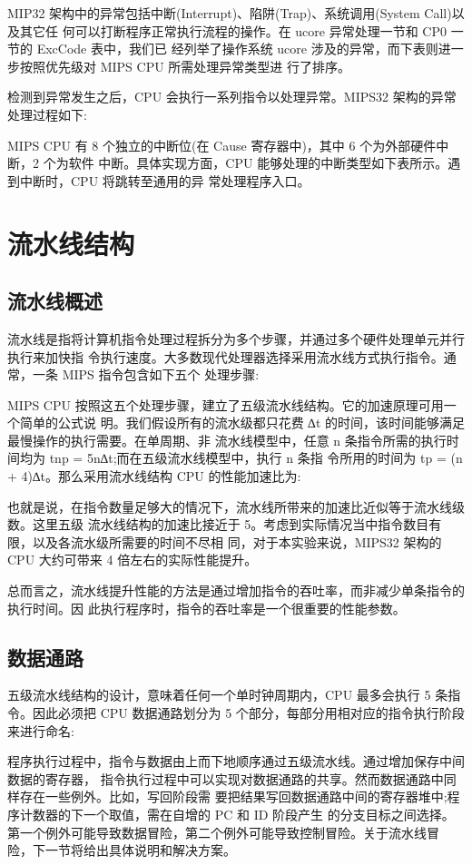 \documentclass[11pt,utf8]{article}
\begin{document}
MIP32 架构中的异常包括中断(Interrupt)、陷阱(Trap)、系统调用(System Call)以及其它任 何可以打断程序正常执行流程的操作。在 ucore 异常处理一节和 CP0 一节的 ExcCode 表中，我们已 经列举了操作系统 ucore 涉及的异常，而下表则进一步按照优先级对 MIPS CPU 所需处理异常类型进 行了排序。

检测到异常发生之后，CPU 会执行一系列指令以处理异常。MIPS32 架构的异常处理过程如下:

MIPS CPU 有 8 个独立的中断位(在 Cause 寄存器中)，其中 6 个为外部硬件中断，2 个为软件
中断。具体实现方面，CPU 能够处理的中断类型如下表所示。遇到中断时，CPU 将跳转至通用的异 常处理程序入口。

\section{流水线结构}

\subsection{流水线概述}
流水线是指将计算机指令处理过程拆分为多个步骤，并通过多个硬件处理单元并行执行来加快指 令执行速度。大多数现代处理器选择采用流水线方式执行指令。通常，一条 MIPS 指令包含如下五个 处理步骤:

MIPS CPU 按照这五个处理步骤，建立了五级流水线结构。它的加速原理可用一个简单的公式说 明。我们假设所有的流水级都只花费 ∆t 的时间，该时间能够满足最慢操作的执行需要。在单周期、非 流水线模型中，任意 n 条指令所需的执行时间均为 tnp = 5n∆t;而在五级流水线模型中，执行 n 条指 令所用的时间为 tp = (n + 4)∆t。那么采用流水线结构 CPU 的性能加速比为:

也就是说，在指令数量足够大的情况下，流水线所带来的加速比近似等于流水线级数。这里五级 流水线结构的加速比接近于 5。考虑到实际情况当中指令数目有限，以及各流水级所需要的时间不尽相 同，对于本实验来说，MIPS32 架构的 CPU 大约可带来 4 倍左右的实际性能提升。

总而言之，流水线提升性能的方法是通过增加指令的吞吐率，而非减少单条指令的执行时间。因 此执行程序时，指令的吞吐率是一个很重要的性能参数。
\subsection{数据通路}
五级流水线结构的设计，意味着任何一个单时钟周期内，CPU 最多会执行 5 条指令。因此必须把
CPU 数据通路划分为 5 个部分，每部分用相对应的指令执行阶段来进行命名:

程序执行过程中，指令与数据由上而下地顺序通过五级流水线。通过增加保存中间数据的寄存器， 指令执行过程中可以实现对数据通路的共享。然而数据通路中同样存在一些例外。比如，写回阶段需 要把结果写回数据通路中间的寄存器堆中;程序计数器的下一个取值，需在自增的 PC 和 ID 阶段产生 的分支目标之间选择。第一个例外可能导致数据冒险，第二个例外可能导致控制冒险。关于流水线冒 险，下一节将给出具体说明和解决方案。
\end{document}
